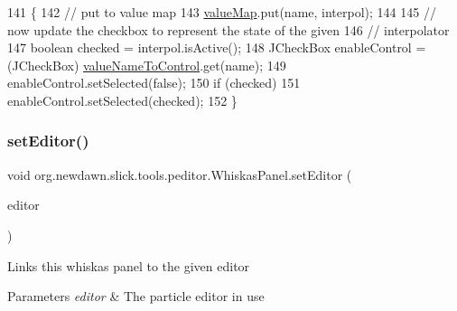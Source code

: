 \begin{DoxyCode}
141                                                                          \{
142         \textcolor{comment}{// put to value map}
143         \mbox{\hyperlink{classorg_1_1newdawn_1_1slick_1_1tools_1_1peditor_1_1_whiskas_panel_a952aebc524d9c88dc4dc7bb7e2231fd1}{valueMap}}.put(name, interpol);
144 
145         \textcolor{comment}{// now update the checkbox to represent the state of the given}
146         \textcolor{comment}{// interpolator}
147         \textcolor{keywordtype}{boolean} checked = interpol.isActive();
148         JCheckBox enableControl = (JCheckBox) \mbox{\hyperlink{classorg_1_1newdawn_1_1slick_1_1tools_1_1peditor_1_1_whiskas_panel_a299a865d47b6d893171286b501af69cb}{valueNameToControl}}.get(name);
149         enableControl.setSelected(\textcolor{keyword}{false});
150         \textcolor{keywordflow}{if} (checked)
151             enableControl.setSelected(checked);
152     \}
\end{DoxyCode}
\mbox{\label{classorg_1_1newdawn_1_1slick_1_1tools_1_1peditor_1_1_whiskas_panel_a4686898fc7dbd9aa6fd3ca5d3f850e50}} 
\subsubsection{\texorpdfstring{set\+Editor()}{setEditor()}}
{\footnotesize\ttfamily void org.\+newdawn.\+slick.\+tools.\+peditor.\+Whiskas\+Panel.\+set\+Editor (\begin{DoxyParamCaption}\item[{\mbox{\hyperlink{classorg_1_1newdawn_1_1slick_1_1tools_1_1peditor_1_1_graph_editor_window}{Graph\+Editor\+Window}}}]{editor }\end{DoxyParamCaption})\hspace{0.3cm}{\ttfamily [inline]}}

Links this whiskas panel to the given editor


\begin{DoxyParams}{Parameters}
{\em editor} & The particle editor in use \\
\hline
\end{DoxyParams}

